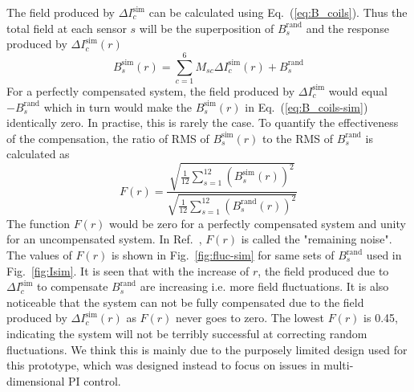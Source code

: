 

The field produced by $ \Delta I_c^{\text{sim}}$ can be calculated using Eq.~(\ref{eq:B_coils}). Thus the total field at each sensor $s$ will be the superposition of $B_s^{\text{rand}}$ and the response produced by $ \Delta I_c^{\text{sim}}(r)$ 
\begin{equation}\label{eq:B_coils-sim}
    B_s^{\text{sim}}(r) =\sum_{c=1}^6 M_{sc} \Delta I_c^{\text{sim}}(r) + B_s^{\text{rand}}
\end{equation}
For a perfectly compensated system, the field produced by $ \Delta I_c^{\text{sim}}$ would equal $- B_s^{\text{rand}}$ which in turn would make the $B_s^{\text{sim}}(r)$ in Eq.~(\ref{eq:B_coils-sim}) identically zero. In practise, this is rarely the case. To quantify the effectiveness of the compensation,  the ratio of RMS of $B_s^{\text{sim}}(r)$ to the RMS of $B_s^{\text{rand}}$ is calculated as
\begin{equation}\label{eq:fluc}
    F(r)=\frac{\sqrt{\frac{1}{12} \sum_{s=1}^{12} (B_s^{\text{sim}}(r))^2}}{\sqrt{\frac{1}{12} \sum_{s=1}^{12} (B_s^{\text{rand}}(r))^2}}
\end{equation}
The function $F(r)$ would be zero for a perfectly compensated system and unity for an uncompensated system. In Ref.~\cite{bea}, $F(r)$ is called the "remaining noise". The values of $F(r)$ is shown in Fig.~\ref{fig:fluc-sim} for same sets of $B_s^{\text{rand}}$ used in Fig.~\ref{fig:Isim}. It is seen that with the increase of $r$, the field produced due to $\Delta I_c^{\text{sim}}$ to compensate $B_s^{\text{rand}}$  are increasing i.e. more field fluctuations. It is also noticeable that the system can not be fully compensated due to the field produced by $ \Delta I_c^{\text{sim}}(r)$ as $F(r)$ never goes to zero. The lowest $F(r)$ is 0.45, indicating the system will not be terribly successful at correcting random fluctuations. We think this is mainly due to the purposely limited design used for this prototype, which was designed instead to focus on issues in multi-dimensional PI control.

